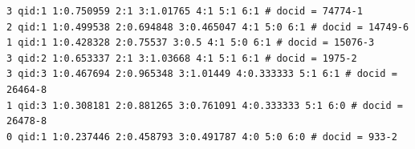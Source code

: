 \begin{lstlisting}
3 qid:1 1:0.750959 2:1 3:1.01765 4:1 5:1 6:1 # docid = 74774-1
2 qid:1 1:0.499538 2:0.694848 3:0.465047 4:1 5:0 6:1 # docid = 14749-6
1 qid:1 1:0.428328 2:0.75537 3:0.5 4:1 5:0 6:1 # docid = 15076-3
3 qid:2 1:0.653337 2:1 3:1.03668 4:1 5:1 6:1 # docid = 1975-2
3 qid:3 1:0.467694 2:0.965348 3:1.01449 4:0.333333 5:1 6:1 # docid = 26464-8
1 qid:3 1:0.308181 2:0.881265 3:0.761091 4:0.333333 5:1 6:0 # docid = 26478-8
0 qid:1 1:0.237446 2:0.458793 3:0.491787 4:0 5:0 6:0 # docid = 933-2
\end{lstlisting}
